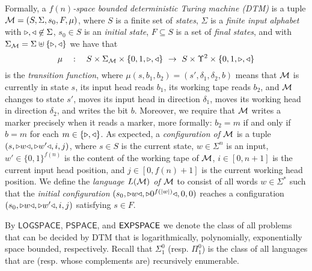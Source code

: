 \documentclass[times,envcountsame]{llncs}
\def\CTL{{\text{CTL}}}
\def\EF{{\mathsf{EF}}}
\def\PSPACE{{\mathsf{PSPACE}}}
\renewcommand{\L}{\mathsf{LOGSPACE}}
\newcommand{\add}[1]{\ensuremath{\mathsf{add}(#1)}}
\begin{document}
Formally, a {\em $f(n)$-space bounded deterministic Turing machine (DTM)} is a tuple
$\mathcal{M}=(S,\Sigma,s_0,F,\mu)$, where $S$ is a finite set of {\em states},
$\Sigma$ is a {\em finite input alphabet} with $\triangleright,\triangleleft\not\in\Sigma$,
$s_0\in S$ is an {\em initial state}, $F\subseteq S$ is a set of {\em final
states}, and with $\Sigma_{\mathcal{M}}=\Sigma\uplus\{\triangleright,\triangleleft\}$ we have that
$$\mu\quad:\quad S\times\Sigma_{\mathcal{M}}\times\{0,1,\triangleright,\triangleleft\}\ \rightarrow\
S\times\Upsilon^2\times\{0,1,\triangleright,\triangleleft\}$$
is the {\em transition function}, where $\mu(s,b_1,b_2)=(s',\delta_1,\delta_2,b)$ means
that $\mathcal{M}$ is currently in state $s$, its input head reads $b_1$, its
working tape reads $b_2$, and $\mathcal{M}$ changes to state $s'$, moves its
input head in direction $\delta_1$,
moves its working head in direction $\delta_2$, and
writes the bit $b$.
Moreover, we require that $\mathcal{M}$ writes a marker precisely when it reads a marker,
more formally: $b_2=m$ if and only if $b=m$ for each $m\in\{\triangleright,\triangleleft\}$.
As expected, a {\em configuration of $\mathcal{M}$} is a tuple $(s,\triangleright w\triangleleft,\triangleright w'\triangleleft,i,j)$,
where $s\in S$ is the current state,
$w\in\Sigma^n$ is an input,
$w'\in\{0,1\}^{f(n)}$ is the content of the working tape of $\mathcal{M}$,
$i\in[0,n+1]$ is the current input head position, and
$j\in[0,f(n)+1]$ is the current working head position.
We define the {\em language $L(\mathcal{M})$ of $\mathcal{M}$} to consist of all words
$w\in\Sigma^*$ such that
the {\em initial configuration}
$(s_0,\triangleright w\triangleleft,\triangleright 0^{f(|w|)}\triangleleft,0,0)$ reaches a configuration
$(s_0,\triangleright w\triangleleft,\triangleright w'\triangleleft,i,j)$ satisfying $s\in F$.

By $\L$, $\PSPACE$, and ${\mathsf{EXPSPACE}}$ we denote the class of all
problems that can be decided by DTM that
is logarithmically, polynomially, exponentially space bounded,
respectively. Recall that $\Sigma^0_1$ (resp. $\Pi^0_1$) is the class of
all languages that are (resp. whose complements are) recursively enumerable.
\newcommand{\Prop}{\mathcal{P}}
\newcommand{\Op}{\text{Op}}
\renewcommand{\A}{\mathbb{A}}
\bigskip
\end{document}
